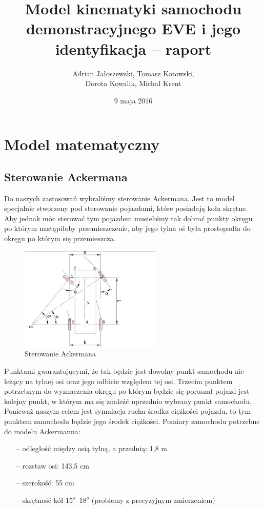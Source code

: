 \documentclass[a4paper, 12pt]{report}
\author{Adrian Jałoszewski, Tomasz Kotowski,\\ Dorota Kowalik, Michał Krent}
\title{Model kinematyki samochodu demonstracyjnego EVE i jego identyfikacja -- raport}
\date{9 maja 2016}
\begin{document}
	\maketitle
	\tableofcontents
	\newpage
	\chapter{Model matematyczny}
		\section{Sterowanie Ackermana}
			Do naszych zastosowań wybraliśmy sterowanie Ackermana. Jest to model specjalnie stworzony pod sterowanie pojazdami, które posiadają koła skrętne. Aby jednak móc sterować tym pojazdem musieliśmy tak dobrać punkty okręgu po którym nastąpiłoby przemieszczenie, aby jego tylna oś była prostopadła do okręgu po którym się przemieszcza.
			\begin{figure}[H]
				\centering
				\includegraphics[width = 0.6\textwidth]{./img/ackerman.png}
				\caption{Sterowanie Ackermana}
			\end{figure}
			\noindent Punktami gwarantującymi, że tak będzie jest dowolny punkt samochodu nie leżący na tylnej osi oraz jego odbicie względem tej osi. Trzecim punktem potrzebnym do wyznaczenia okręgu po którym będzie się poruszał pojazd jest kolejny punkt, w którym ma się znaleźć uprzednio wybrany punkt samochodu. Ponieważ naszym celem jest symulacja ruchu środka ciężkości pojazdu, to tym punktem samochodu będzie jego środek ciężkości. 
			\newline
			\newline
			Pomiary samochodu potrzebne do modelu Ackermanna:
			\begin{itemize}
				\item[--] odległość między osią tylną, a przednią: 1,8 m
				\item[--] rozstaw osi: 143,5 cm
				\item[--] szerokość: 55 cm
				\item[--] skrętność kół $15^o$--$18^o$ (problemy z precyzyjnym zmierzeniem) 
			\end{itemize}
\end{document}
